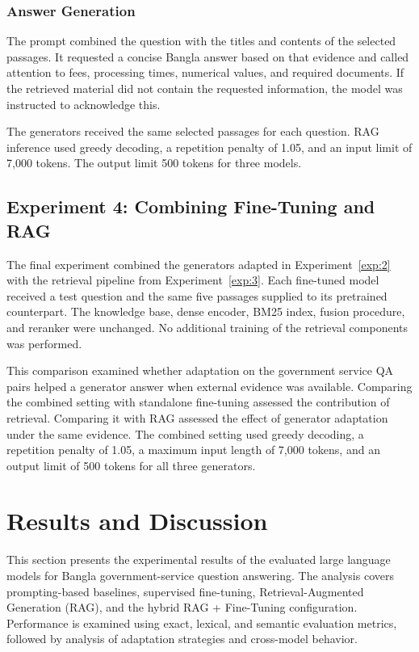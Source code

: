 \documentclass[10pt,journal,compsoc]{IEEEtran}
\begin{document}
\subsubsection{Answer Generation}

The prompt combined the question with the titles and contents of the selected passages. It requested a concise Bangla answer based on that evidence and called attention to fees, processing times, numerical values, and required documents. If the retrieved material did not contain the requested information, the model was instructed to acknowledge this.

The generators received the same selected passages for each question. RAG inference used greedy decoding, a repetition penalty of 1.05, and an input limit of 7,000 tokens. The output limit 500 tokens for three models.

\subsection{Experiment 4: Combining Fine-Tuning and RAG}
\label{exp:4}

The final experiment combined the generators adapted in Experiment~\ref{exp:2} with the retrieval pipeline from Experiment~\ref{exp:3}. Each fine-tuned model received a test question and the same five passages supplied to its pretrained counterpart. The knowledge base, dense encoder, BM25 index, fusion procedure, and reranker were unchanged. No additional training of the retrieval components was performed.

This comparison examined whether adaptation on the government service QA pairs helped a generator answer when external evidence was available. Comparing the combined setting with standalone fine-tuning assessed the contribution of retrieval. Comparing it with RAG assessed the effect of generator adaptation under the same evidence. The combined setting used greedy decoding, a repetition penalty of 1.05, a maximum input length of 7,000 tokens, and an output limit of 500 tokens for all three generators.

\section{Results and Discussion}

This section presents the experimental results of the evaluated large
language models for Bangla government-service question answering. The
analysis covers prompting-based baselines, supervised fine-tuning,
Retrieval-Augmented Generation (RAG), and the hybrid RAG + Fine-Tuning
configuration. Performance is examined using exact, lexical, and semantic
evaluation metrics, followed by analysis of adaptation strategies and
cross-model behavior.
\end{document}
